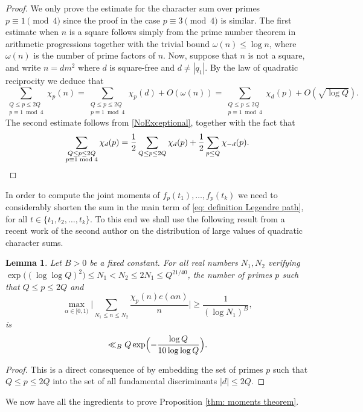 \documentclass[10pt]{amsart}
\theoremstyle{plain}
\newtheorem{lem}[thm]{Lemma}
\theoremstyle{definition}
\begin{document}
\begin{proof} We only prove the estimate for the character sum over primes $p\equiv 1 \pmod 4$ since the proof in the case $p\equiv 3 \pmod 4$ is similar.
The first estimate when $n$ is a square follows simply from the prime number theorem in arithmetic progressions together with the trivial bound $\omega(n)\leq \log n$, where $\omega(n)$ is the number of prime factors of $n$. Now, suppose that $n$ is not a square, and write $n=dm^2$ where $d$ is square-free and $d\neq |q_1|$. By the law of quadratic reciprocity we deduce that
\[
\sum_{\substack{Q\leq p\leq 2Q\\ p\equiv 1 \bmod 4}} \chi_p(n)= \sum_{\substack{Q\leq p\leq 2Q\\ p\equiv 1 \bmod 4}}\chi_p(d) + O(\omega(n))= \sum_{\substack{Q\leq p\leq 2Q\\ p\equiv 1 \bmod 4}}\chi_d(p) + O(\sqrt{\log Q}).
\]
The second estimate follows from \eqref{NoExceptional}, together with the fact that
\[\sum_{\substack{Q\leq p\leq 2Q\\ p\equiv 1 \bmod 4}}\chi_d(p)= \frac{1}{2} \sum_{Q\leq p\leq 2Q}\chi_d(p) + \frac{1}{2}\sum_{p\leq Q}\chi_{-d}(p).\qedhere
\]
\end{proof}

In order to compute the joint moments of $f_{p}(t_1), \dots, f_{p}(t_k)$ we need to considerably shorten the sum in the main term of \eqref{eq: definition Legendre path}, for all $t\in \{t_1, t_2, \dots, t_k\}$. To this end we shall use the following result from a recent work of the second author \cite{La} on the distribution of large values of quadratic character sums.

\begin{lem}\label{lem: Tail2} Let $B>0$ be a fixed constant. For all real numbers $N_1, N_2$ verifying $ \exp\big((\log\log Q)^2\big)\leq N_1 < N_2\leq 2N_1\leq Q^{21/40}$, the number of primes $p$ such that $Q\leq p\leq 2Q$ and
\[
\max_{\alpha\in [0, 1)}\biggl|\sum_{N_1\leq n\leq N_2} \frac{\chi_p(n) e(\alpha n)}{n}\biggr|\geq \frac{1}{(\log N_1)^B},
\]
is
\[
\ll_B Q\exp\Bigl(-\frac{\log Q}{10 \log\log Q}\Bigr).\]
\end{lem}
\begin{proof} This is a direct consequence of \cite[Prop.\,4.2 \& 4.3]{La} by embedding the set of primes $p$ such that $Q\leq p\leq 2Q$ into the set of all fundamental discriminants $|d|\leq 2Q$.
\end{proof}

We now have all the ingredients to prove Proposition \ref{thm: moments theorem}.
\end{document}

